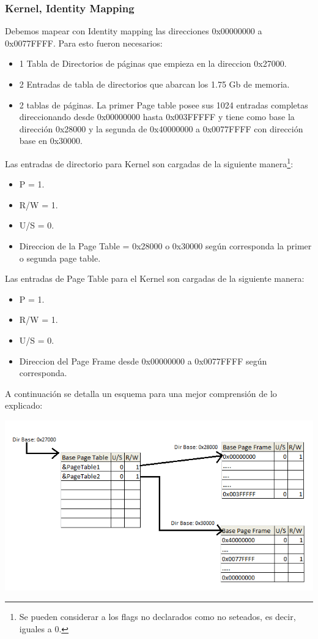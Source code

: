 \subsubsection{Kernel, Identity Mapping}
Debemos mapear con Identity mapping las direcciones 0x00000000 a 0x0077FFFF. Para esto fueron necesarios:
\begin{itemize}
 \item 1 Tabla de Directorios de p\'aginas que empieza en la direccion 0x27000.
 \item 2 Entradas de tabla de directorios que abarcan los 1.75 Gb de memoria. 
 \item 2 tablas de p\'aginas. La primer Page table posee sus 1024 entradas completas direccionando desde 0x00000000 hasta 0x003FFFFF 
y tiene como base la direcci\'on 0x28000 y la segunda de 0x40000000 a 0x0077FFFF con direcci\'on base en 0x30000.
\end{itemize}

Las entradas de directorio para Kernel son cargadas de la siguiente manera\footnote{Se pueden considerar a los flags no declarados como
no seteados, es decir, iguales a 0.}:
\begin{itemize}
 \item P = 1.
 \item R/W = 1.
 \item U/S = 0.
 \item Direccion de la Page Table = 0x28000 o 0x30000 seg\'un corresponda la primer o segunda page table.
\end{itemize}

Las entradas de Page Table para el Kernel son cargadas de la siguiente manera\footnotemark[3]:
\begin{itemize}
 \item P = 1.
 \item R/W = 1.
 \item U/S = 0.
 \item Direccion del Page Frame desde 0x00000000 a 0x0077FFFF seg\'un corresponda.
\end{itemize}

A continuaci\'on se detalla un esquema para una mejor comprensi\'on de lo explicado:

\includegraphics[scale=0.6]{imagenes/tablasDePaginasEj3.png}


